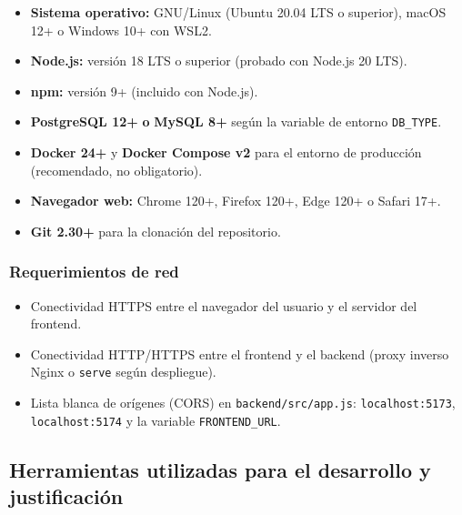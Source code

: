\documentclass[12pt,letterpaper]{article}
\begin{document}
\begin{itemize}
    \item \textbf{Sistema operativo:} GNU/Linux (Ubuntu 20.04 LTS o superior), macOS 12+ o Windows 10+ con WSL2.
    \item \textbf{Node.js:} versión 18 LTS o superior (probado con Node.js 20 LTS).
    \item \textbf{npm:} versión 9+ (incluido con Node.js).
    \item \textbf{PostgreSQL 12+} \textbf{o} \textbf{MySQL 8+} según la variable de entorno \texttt{DB\_TYPE}.
    \item \textbf{Docker 24+} y \textbf{Docker Compose v2} para el entorno de producción (recomendado, no obligatorio).
    \item \textbf{Navegador web:} Chrome 120+, Firefox 120+, Edge 120+ o Safari 17+.
    \item \textbf{Git 2.30+} para la clonación del repositorio.
\end{itemize}

\subsubsection{Requerimientos de red}

\begin{itemize}
    \item Conectividad HTTPS entre el navegador del usuario y el servidor del frontend.
    \item Conectividad HTTP/HTTPS entre el frontend y el backend (proxy inverso Nginx o \texttt{serve} según despliegue).
    \item Lista blanca de orígenes (CORS) en \texttt{backend/src/app.js}: \texttt{localhost:5173}, \texttt{localhost:5174} y la variable \texttt{FRONTEND\_URL}.
\end{itemize}

\subsection{Herramientas utilizadas para el desarrollo y justificación}
\end{document}
